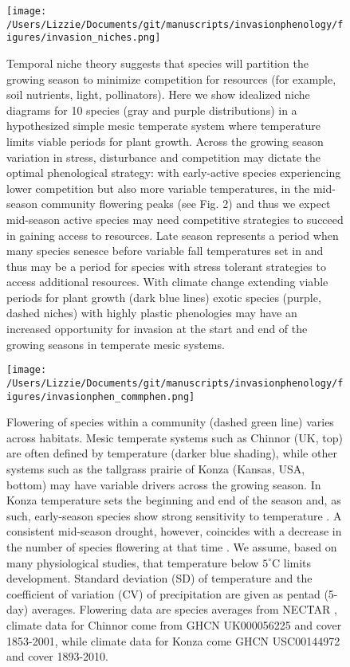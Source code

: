 \documentclass[11pt,a4paper,oneside]{article}
\begin{document}
\newpage
\begin{figure}[h!]
\centering
\noindent \texttt{[image: /Users/Lizzie/Documents/git/manuscripts/invasionphenology/figures/invasion\_niches.png]}
\caption{Temporal niche theory suggests that species will partition the growing season to minimize competition for resources (for example, soil nutrients, light, pollinators). Here we show idealized niche diagrams for 10 species (gray and purple distributions) in a hypothesized simple mesic temperate system where temperature limits viable periods for plant growth. Across the growing season variation in stress, disturbance and competition may dictate the optimal phenological strategy: with early-active species experiencing lower competition but also more variable temperatures, in the mid-season community flowering peaks (see Fig. 2) and thus we expect mid-season active species may need competitive strategies to succeed in gaining access to resources. Late season represents a period when many species senesce before variable fall temperatures set in and thus may be a period for species with stress tolerant strategies to access additional resources. With climate change extending viable periods for plant growth (dark blue lines) exotic species (purple, dashed niches) with highly plastic phenologies may have an increased opportunity for invasion at the start and end of the growing seasons in temperate mesic systems.}
\end{figure}

\newpage
\begin{figure}[h!]
\centering
\noindent \texttt{[image: /Users/Lizzie/Documents/git/manuscripts/invasionphenology/figures/invasionphen\_commphen.png]}
\caption{Flowering of species within a community (dashed green line) varies across habitats. Mesic temperate systems such as Chinnor (UK, top) are often defined by temperature (darker blue shading), while other systems such as the tallgrass prairie of Konza (Kansas, USA, bottom) may have variable drivers across the growing season. In Konza temperature sets the beginning and end of the season and, as such, early-season species show strong sensitivity to temperature \citep{Cook:2012,Craine:2012kl}. A consistent mid-season drought, however, coincides with a decrease in the number of species flowering at that time \citep{Craine:2012kl}. We assume, based on many physiological studies, that temperature below \(5^{\circ}\mathrm{C}\) limits development. Standard deviation (SD) of temperature and the coefficient of variation (CV) of precipitation are given as pentad (5-day) averages. Flowering data are species averages from NECTAR \citep{nectar}, climate data for Chinnor come from GHCN UK000056225 and cover 1853-2001, while climate data for Konza come GHCN USC00144972 and cover 1893-2010.}
\end{figure}
\end{document}
